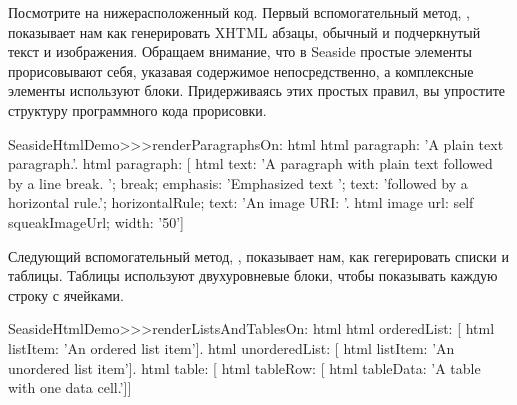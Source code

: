 \documentclass[a4paper,10pt,twoside]{book}
\begin{document}


Посмотрите на нижерасположенный код.
Первый вспомогательный метод, ,
показывает нам как генерировать XHTML абзацы,
обычный и подчеркнутый текст и изображения.
Обращаем внимание, что в Seaside простые элементы прорисовывают себя,
указавая содержимое непосредственно,
а комплексные элементы используют блоки.
Придерживаясь этих простых правил,
вы упростите структуру программного кода прорисовки.

\begin{code}{}
SeasideHtmlDemo>>>renderParagraphsOn: html 
	html paragraph: 'A plain text paragraph.'.
	html paragraph: [
		html
			text: 'A paragraph with plain text followed by a line break. ';
			break;
			emphasis: 'Emphasized text ';
			text: 'followed by a horizontal rule.';
			horizontalRule;
			text: 'An image URI: '.
		html image
			url: self squeakImageUrl;
			width: '50']
\end{code}


Следующий вспомогательный метод,
,
показывает нам, как гегерировать списки и таблицы.
Таблицы используют двухуровневые блоки,
чтобы показывать каждую строку с ячейками.

\begin{code}{}
SeasideHtmlDemo>>>renderListsAndTablesOn: html 
	html orderedList: [
		html listItem: 'An ordered list item'].
	html unorderedList: [
		html listItem: 'An unordered list item'].
	html table: [
		html tableRow: [
			html tableData: 'A table with one data cell.']]
\end{code}
\end{document}

